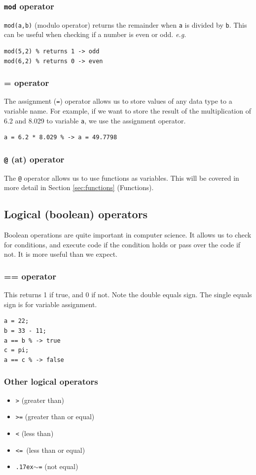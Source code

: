 \documentclass[12pt]{article}
\begin{document}
\subsubsection{\texttt{mod} operator}
\texttt{mod(a,b)} (modulo operator) returns the remainder when \texttt{a} is divided by \texttt{b}. This can be useful when checking if a number is even or odd. \textit{e.g.}
\begin{lstlisting}
mod(5,2) % returns 1 -> odd
mod(6,2) % returns 0 -> even
\end{lstlisting}

\subsubsection{= operator}
The assignment (\texttt{=}) operator allows us to store values of any data type to a variable name. For example, if we want to store the result of the multiplication of 6.2 and 8.029 to variable \texttt{a}, we use the assignment operator.
\begin{lstlisting}
a = 6.2 * 8.029 % -> a = 49.7798
\end{lstlisting}

\subsubsection{\texttt{@} (at) operator}
The \texttt{@} operator allows us to use functions as variables. This will be covered in more detail in Section \ref{sec:functions} (Functions). 

\subsection{Logical (boolean) operators}
Boolean operations are quite important in computer science. It allows us to check for conditions, and execute code if the condition holds or pass over the code if not. It is more useful than we expect.

\subsubsection{== operator}
This returns 1 if true, and 0 if not. Note the double equals sign. The single equals sign is for variable assignment. 
\begin{lstlisting}
a = 22;
b = 33 - 11;
a == b % -> true
c = pi;
a == c % -> false
\end{lstlisting}

\subsubsection{Other logical operators}
\begin{itemize}
\item \texttt{>} (greater than)
\item \texttt{>=} (greater than or equal)
\item \texttt{<} (less than)
\item \texttt{<= }(less than or equal)
\item \texttt{{\raise.17ex\hbox{$\scriptstyle\mathtt{\sim}$}}=} (not equal)
\end{itemize}
\end{document}
